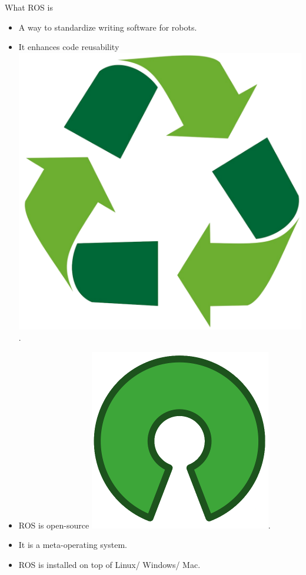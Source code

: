 \documentclass{beamer}
\begin{document}
\begin{frame}{What ROS is}

    \begin{itemize}
        \item A way to standardize writing software for robots.
        \item It enhances {\huge code reusability} \includegraphics[scale=0.02]{figures/recycling.png}.
        \item ROS is open-source \includegraphics[scale=0.09]{figures/open_source.png}.
        \item It is a meta-operating system.
        \item ROS is installed on top of Linux/ Windows/ Mac.


\end{itemize}
\end{frame}
\end{document}
